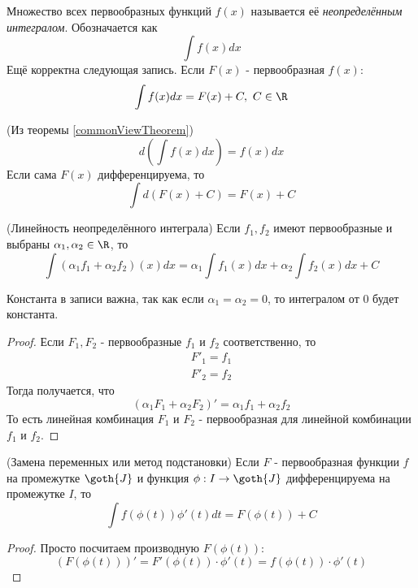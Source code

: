 \begin{definition}
	Множество всех первообразных функций $f(x)$ называется её \textit{неопределённым интегралом}. Обозначается как
	\[
		\int f(x)dx
	\]
	Ещё корректна следующая запись. Если $F(x)$ - первообразная $f(x)$:
	\[
	 	\int f(x)dx = F(x) + C,\ C \in \R
	\]
\end{definition}

\begin{corollary} (Из теоремы \ref{commonViewTheorem})
	\[
		d\left(\int f(x)dx\right) = f(x)dx
	\]
	Если сама $F(x)$ дифференцируема, то
	\[
		\int d\left(F(x) + C\right) = F(x) + C
	\]
\end{corollary}

\begin{theorem} (Линейность неопределённого интеграла)
	Если $f_1, f_2$ имеют первообразные и выбраны $\alpha_1, \alpha_2 \in \R$, то
	\[
		\int(\alpha_1 f_1 + \alpha_2 f_2)(x)dx = \alpha_1\int f_1(x)dx + \alpha_2 \int f_2(x)dx + C
	\]
\end{theorem}

\begin{note}
	Константа в записи важна, так как если $\alpha_1 = \alpha_2 = 0$, то интегралом от 0 будет константа.
\end{note}

\begin{proof}
	Если $F_1, F_2$ - первообразные $f_1$ и $f_2$ соответственно, то
	\begin{align*}
		F'_1 = f_1
		\\
		F'_2 = f_2
	\end{align*}
	Тогда получается, что
	\[
		\left(\alpha_1 F_1 + \alpha_2 F_2\right)' = \alpha_1 f_1 + \alpha_2 f_2
	\]
	То есть линейная комбинация $F_1$ и $F_2$ - первообразная для линейной комбинации $f_1$ и $f_2$.
\end{proof}

\begin{theorem} (Замена переменных или метод подстановки)
	Если $F$ - первообразная функции $f$ на промежутке $\goth{J}$ и функция $\phi: I \to \goth{J}$ дифференцируема на промежутке $I$, то
	\[
		\int f(\phi(t))\phi'(t)dt = F(\phi(t)) + C
	\]
\end{theorem}

\begin{proof}
	Просто посчитаем производную $F(\phi(t))$:
	\[
		\left(F(\phi(t))\right)' = F'(\phi(t)) \cdot \phi'(t) = f(\phi(t)) \cdot \phi'(t)
	\]
\end{proof}

